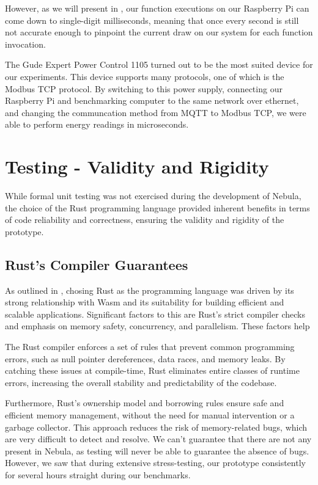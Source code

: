 \documentclass[
  table]{report}
\begin{document}
However, as we will present in , our function
executions on our Raspberry Pi can come down to single-digit
milliseconds, meaning that once every second is still not accurate
enough to pinpoint the current draw on our system for each function
invocation.

The Gude Expert Power Control 1105 turned out to be the most suited
device for our experiments. This device supports many protocols, one of
which is the Modbus TCP protocol. By switching to this power supply,
connecting our Raspberry Pi and benchmarking computer to the same
network over ethernet, and changing the communcation method from
\ac{MQTT} to Modbus TCP, we were able to perform energy readings in
microseconds.

\section{Testing - Validity and Rigidity}

While formal unit testing was not exercised during the development of
Nebula, the choice of the Rust programming language provided inherent
benefits in terms of code reliability and correctness, ensuring the
validity and rigidity of the prototype.

\subsection{Rust's Compiler Guarantees}

As outlined in , chosing Rust as the programming
language was driven by its strong relationship with \ac{Wasm} and its
suitability for building efficient and scalable applications.
Significant factors to this are Rust's strict compiler checks and
emphasis on memory safety, concurrency, and parallelism. These factors
help

The Rust compiler enforces a set of rules that prevent common
programming errors, such as null pointer dereferences, data races, and
memory leaks. By catching these issues at compile-time, Rust eliminates
entire classes of runtime errors, increasing the overall stability and
predictability of the codebase.

Furthermore, Rust's ownership model and borrowing rules ensure safe and
efficient memory management, without the need for manual intervention or
a garbage collector. This approach reduces the risk of memory-related
bugs, which are very difficult to detect and resolve. We can't guarantee
that there are not any present in Nebula, as testing will never be able
to guarantee the absence of bugs. However, we saw that during extensive
stress-testing, our prototype consistently for several hours straight
during our benchmarks.
\end{document}
